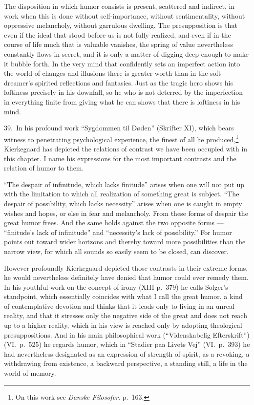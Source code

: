 \documentclass[12pt]{book}
\newcommand{\opage}[1]{\marginnote{\footnotesize\textit{[#1]}}}
\begin{document}
The disposition in which humor consists is present, scattered and indirect, in work when this
is done without self-importance, without sentimentality, without oppressive melancholy,
without garrulous dwelling. The presupposition is that even if the ideal that stood before us
is not fully realized, and even if in the course of life much that is valuable vanishes, the
spring of value nevertheless constantly flows in secret, and it is only a matter of digging
deep enough to make it bubble forth. In the very mind that confidently sets an imperfect
action into the world of changes and illusions there is greater worth than in the soft
dreamer's spirited reflections and fantasies. Just as the tragic hero shows his loftiness
precisely in his downfall, so he who is not deterred by the imperfection in everything finite
from giving what he can shows that there is loftiness in his mind.

39.~In his profound work ``Sygdommen til Døden'' (Skrifter XI), which bears witness to
penetrating psychological experience, the finest of all he produced,\footnote{On this work see
\textit{Danske Filosofer}. p.~163.} Kierkegaard has depicted the relations of contrast we
have been occupied with in this chapter. I name his expressions for the most important
contrasts and the relation of humor to them.

``The despair of infinitude, which lacks finitude'' arises when one will not put up with the
limitation to which all realization \opage{133}of something great is subject. ``The despair
of possibility, which lacks necessity'' arises when one is caught in empty wishes and hopes,
or else in fear and melancholy. From these forms of despair the great humor frees. And the
same holds against the two opposite forms --- ``finitude's lack of infinitude'' and
``necessity's lack of possibility.'' For humor points out toward wider horizons and thereby
toward more possibilities than the narrow view, for which all sounds so easily seem to be
closed, can discover.

However profoundly Kierkegaard depicted those contrasts in their extreme forms, he would
nevertheless definitely have denied that humor could ever remedy them. In his youthful work on
the concept of irony (XIII p.~379) he calls Solger's standpoint, which essentially coincides
with what I call the great humor, a kind of contemplative devotion and thinks that it leads
only to living in an unreal reality, and that it stresses only the negative side of the great
and does not reach up to a higher reality, which in his view is reached only by adopting
theological presuppositions. And in his main philosophical work (``Videnskabelig
Efterskrift'') (VI.\ p.~525) he regards humor, which in ``Stadier paa Livets Vej'' (VI.\
p.~393) he had nevertheless designated as an expression of strength of spirit, as a revoking, a
withdrawing from existence, a backward perspective, a standing still, a life in the world of
memory.
\end{document}
